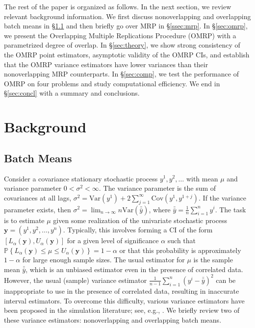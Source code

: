\documentclass[12pt]{article}
\newcommand{\p}[1]{\mathbb{P} \left\{ #1 \right\}}
\newcommand{\y}{\mathbf{y}}
\newcommand{\yb}{\bar{y}}
\newcommand{\ybb}{\bar{\yb}}
\begin{document}
The rest of the paper is organized as follows.  
In the next section, we review relevant background information.  
We first discuss nonoverlapping and overlapping batch means in \S \ref{ssec:obm} and then briefly go over MRP in \S \ref{ssec:mrp}.  
In \S \ref{sec:omrp}, we present the Overlapping Multiple Replications Procedure (OMRP) with a parametrized degree of overlap.  
In \S \ref{sec:theory}, we show strong consistency of the OMRP point estimators, asymptotic validity of the OMRP CIs, and establish that the OMRP variance estimators have lower variances than their nonoverlapping MRP counterparts.
In \S \ref{sec:comp}, we test the performance of OMRP on four problems and study computational efficiency. 
We end in \S \ref{sec:concl} with a summary and conclusions.


\section{Background}
\label{sec:background}


\subsection{Batch Means} 
\label{ssec:obm}

Consider a covariance stationary stochastic process $y^1, y^2, \dots$ with mean $\mu$ and variance parameter $0<\sigma^2<\infty$.  
The variance parameter is the sum of covariances at all lags, $\sigma^2=\mathrm{Var} \left(y^1 \right)+2\sum_{j=1}^{\infty}\mathrm{Cov} \left(y^1,y^{1+j}\right)$. 
If the variance parameter exists, then  $\sigma^2=\lim_{n\rightarrow \infty}n\mathrm{Var} \left(\ybb\right)$, where $\ybb=\frac{1}{n}\sum_{i=1}^{n} y^{i}$.
The task is to estimate $\mu$ given some realization of the univariate stochastic process $\y = (y^1, y^2, \dots, y^n)$.  
Typically, this involves forming a CI of the form $[L_\alpha(\y), U_\alpha(\y)]$ for a given level of significance $\alpha$ such that $\p{L_\alpha(\y) \leq \mu \leq U_\alpha(\y)} = 1 - \alpha$ or that this probability is approximately $1 - \alpha$ for large enough sample sizes.  
The usual estimator for $\mu$ is the sample mean $\ybb$, which is an unbiased estimator even in the presence of correlated data.  
However, the usual (sample) variance estimator $\frac{1}{n-1} \sum_{i=1}^n (y^i - \ybb)^2$ can be inappropriate to use in the presence of correlated data, resulting in inaccurate interval estimators.  
To overcome this difficulty, various variance estimators have been proposed in the simulation literature; see, e.g., \cite{law_07}.  
We briefly review two of these variance estimators: nonoverlapping and overlapping batch means.
\end{document}
